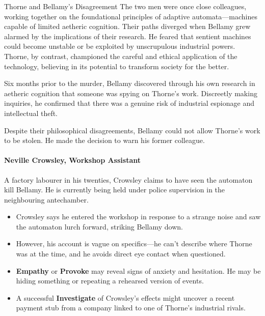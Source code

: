 \begin{CommentBox}{Thorne and Bellamy’s Disagreement}  
    The two men were once close colleagues, working together on the foundational principles of adaptive automata—machines capable of limited aetheric cognition. Their paths diverged when Bellamy grew alarmed by the implications of their research. He feared that sentient machines could become unstable or be exploited by unscrupulous industrial powers. Thorne, by contrast, championed the careful and ethical application of the technology, believing in its potential to transform society for the better.
    
    Six months prior to the murder, Bellamy discovered through his own research in aetheric cognition that someone was spying on Thorne’s work. Discreetly making inquiries, he confirmed that there was a genuine risk of industrial espionage and intellectual theft.

    Despite their philosophical disagreements, Bellamy could not allow Thorne’s work to be stolen. He made the decision to warn his former colleague.
\end{CommentBox}

\vspace{\baselineskip}
\paragraph{Neville Crowsley, Workshop Assistant}
A factory labourer in his twenties, Crowsley claims to have seen the automaton kill Bellamy. He is currently being held under police supervision in the neighbouring antechamber.

\begin{itemize}
    \item Crowsley says he entered the workshop in response to a strange noise and saw the automaton lurch forward, striking Bellamy down.
    \item However, his account is vague on specifics—he can’t describe where Thorne was at the time, and he avoids direct eye contact when questioned.
    \item \textbf{Empathy}  or \textbf{Provoke}  may reveal signs of anxiety and hesitation. He may be hiding something or repeating a rehearsed version of events.
    \item A successful \textbf{Investigate}  of Crowsley’s effects might uncover a recent payment stub from a company linked to one of Thorne’s industrial rivals.
\end{itemize}

